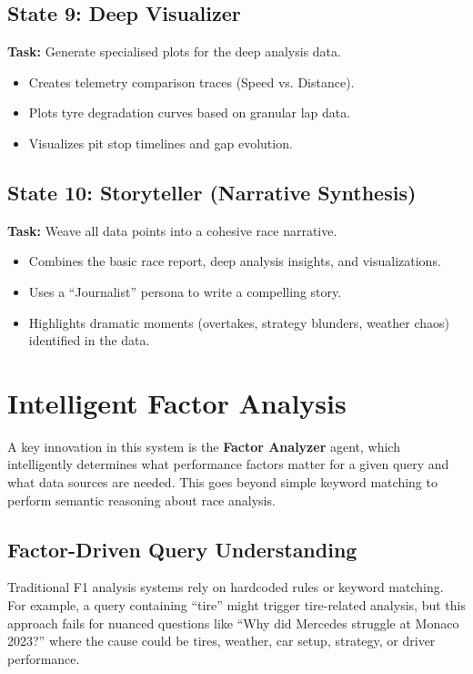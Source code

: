 \documentclass[11pt]{article}
\begin{document}
\subsection*{State 9: Deep Visualizer}

\textbf{Task:} Generate specialised plots for the deep analysis data.

\begin{itemize}[leftmargin=1.5em]
    \item Creates telemetry comparison traces (Speed vs. Distance).
    \item Plots tyre degradation curves based on granular lap data.
    \item Visualizes pit stop timelines and gap evolution.
\end{itemize}

\subsection*{State 10: Storyteller (Narrative Synthesis)}

\textbf{Task:} Weave all data points into a cohesive race narrative.

\begin{itemize}[leftmargin=1.5em]
    \item Combines the basic race report, deep analysis insights, and visualizations.
    \item Uses a ``Journalist'' persona to write a compelling story.
    \item Highlights dramatic moments (overtakes, strategy blunders, weather chaos) identified in the data.
\end{itemize}


\section{Intelligent Factor Analysis}
\label{sec:factor-analysis}

A key innovation in this system is the \textbf{Factor Analyzer} agent, which intelligently determines what performance factors matter for a given query and what data sources are needed. This goes beyond simple keyword matching to perform semantic reasoning about race analysis.

\subsection{Factor-Driven Query Understanding}

Traditional F1 analysis systems rely on hardcoded rules or keyword matching. For example, a query containing ``tire'' might trigger tire-related analysis, but this approach fails for nuanced questions like ``Why did Mercedes struggle at Monaco 2023?'' where the cause could be tires, weather, car setup, strategy, or driver performance.
\end{document}
